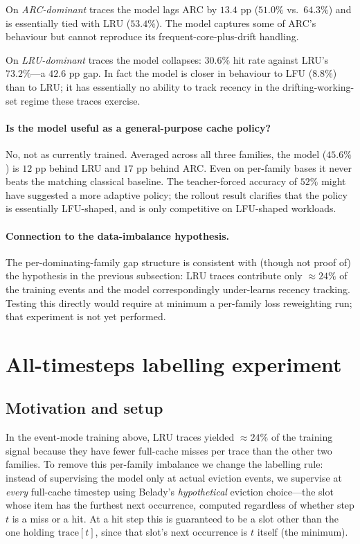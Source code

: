 \documentclass{article}
\begin{document}
On \emph{ARC-dominant} traces the model lags ARC by $13.4$ pp ($51.0\%$ vs.\
$64.3\%$) and is essentially tied with LRU ($53.4\%$). The model captures
some of ARC's behaviour but cannot reproduce its frequent-core-plus-drift
handling.

On \emph{LRU-dominant} traces the model collapses: $30.6\%$ hit rate against
LRU's $73.2\%$---a $42.6$ pp gap. In fact the model is closer in behaviour
to LFU ($8.8\%$) than to LRU; it has essentially no ability to track recency
in the drifting-working-set regime these traces exercise.

\paragraph{Is the model useful as a general-purpose cache policy?} No, not
as currently trained. Averaged across all three families, the model
($45.6\%$) is $12$ pp behind LRU and $17$ pp behind ARC. Even on per-family
bases it never beats the matching classical baseline. The teacher-forced
accuracy of $52\%$ might have suggested a more adaptive policy; the rollout
result clarifies that the policy is essentially LFU-shaped, and is only
competitive on LFU-shaped workloads.

\paragraph{Connection to the data-imbalance hypothesis.} The
per-dominating-family gap structure is consistent with (though not proof of)
the hypothesis in the previous subsection: LRU traces contribute only
$\approx\!24\%$ of the training events and the model correspondingly
under-learns recency tracking. Testing this directly would require at
minimum a per-family loss reweighting run; that experiment is not yet
performed.

\section{All-timesteps labelling experiment}

\subsection{Motivation and setup}

In the event-mode training above, LRU traces yielded $\approx\!24\%$ of the
training signal because they have fewer full-cache misses per trace than the
other two families. To remove this per-family imbalance we change the
labelling rule: instead of supervising the model only at actual eviction
events, we supervise at \emph{every} full-cache timestep using Belady's
\emph{hypothetical} eviction choice---the slot whose item has the furthest
next occurrence, computed regardless of whether step $t$ is a miss or a hit.
At a hit step this is guaranteed to be a slot other than the one holding
$\mathrm{trace}[t]$, since that slot's next occurrence is $t$ itself (the
minimum).
\end{document}
